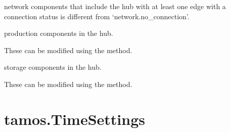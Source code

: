 \documentclass[letterpaper,10pt,english]{sphinxmanual}
\begin{document}
\begin{fulllineitems}
\begin{fulllineitems}
\label{\detokenize{generated/tamos.Hub:tamos.Hub.possibly_connected_networks}}
\pysigstartsignatures
{}
\pysigstopsignatures
\sphinxAtStartPar
network components that include the hub with at least one edge with a connection status is different from ‘network.no\_connection’.

\end{fulllineitems}


\begin{fulllineitems}
\label{\detokenize{generated/tamos.Hub:tamos.Hub.productions}}
\pysigstartsignatures
{}
\pysigstopsignatures
\sphinxAtStartPar
production components in the hub.

\sphinxAtStartPar
These can be modified using the  method.

\end{fulllineitems}


\begin{fulllineitems}
\label{\detokenize{generated/tamos.Hub:tamos.Hub.storages}}
\pysigstartsignatures
{}
\pysigstopsignatures
\sphinxAtStartPar
storage components in the hub.

\sphinxAtStartPar
These can be modified using the  method.

\end{fulllineitems}


\end{fulllineitems}


\sphinxstepscope


\section{tamos.TimeSettings}
\label{\detokenize{generated/tamos.TimeSettings:tamos-timesettings}}\label{\detokenize{generated/tamos.TimeSettings::doc}}
\end{document}
